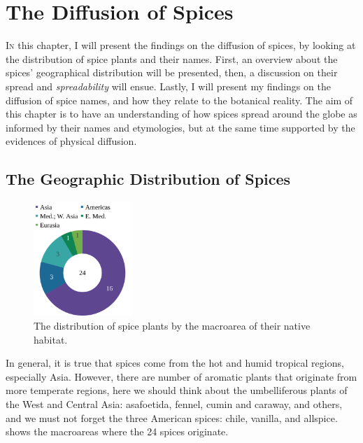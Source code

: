 \chapter{The Diffusion of Spices}
\label{ch:diffusion}




\lettrine[lines=\iniciale]{\textcolor{\accentcolor}{I}}{n} this chapter, I will present the findings on the diffusion of spices, by looking at the distribution of spice plants and their names. First, an overview about the spices' geographical distribution will be presented, then, a discussion on their spread and \textit{spreadability} will ensue. Lastly, I will present my findings on the diffusion of spice names, and how they relate to the botanical reality. The aim of this chapter is to have an understanding of how spices spread around the globe as informed by their names and etymologies, but at the same time supported by the evidences of physical diffusion.

\section{The Geographic Distribution of Spices}

\begin{figure}
    \vspace{-\baselineskip}
    \includegraphics[width=0.33\textwidth]{imgs/plots/macroarea_pie.pdf}
    \caption{The distribution of spice plants by the macroarea of their native habitat.}
    \label{fig:macroarea_pie}
  \end{figure}
  
In general, it is true that spices come from the hot and humid tropical regions, especially Asia. However, there are number of aromatic plants that originate from more temperate regions, here we should think about the umbelliferous plants of the West and Central Asia: asafoetida, fennel, cumin and caraway, and others, and we must not forget the three American spices: chile, vanilla, and allspice.   shows the macroareas where the 24 spices originate.

